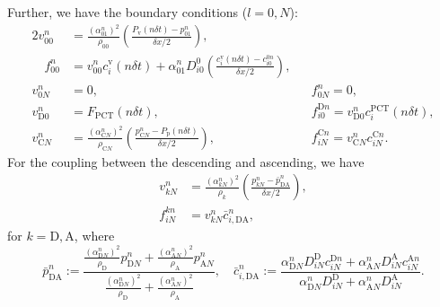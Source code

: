 \documentclass{article}
\begin{document}
Further, we have the boundary conditions ($l=0,N$):
\begin{alignat}{2}
    v_{00}^n &=\frac{(\alpha_{01}^n)^2}{\rho_{00}} \left( \frac{P_\mathrm{v}(n\delta t) - p_{01}^n}{\delta x/2} \right),\nonumber\\
    \quad f_{00}^n &= v_{00}^nc_i^\mathrm{v}(n\delta t)+\alpha_{01}^nD_{i0}^{0}\left( \frac{c_i^{\mathrm{v}}(n\delta t)-c_{i0}^{0n}}{\delta x/2} \right),\\
    v_{0N}^n &= 0,\quad &&f_{0N}^n = 0,\\
    v_{\mathrm{D}0}^n &= F_\mathrm{PCT}(n\delta t),\quad && f_{i0}^{\mathrm{D}n} = v_{\mathrm{D} 0}^nc_i^\mathrm{PCT}(n\delta t),\\
    v_{\mathrm{C}N}^n &= \frac{(\alpha_{\mathrm{C} N}^n)^2}{\rho_{\mathrm{C} N}}\left( \frac{p_{\mathrm{C}N}^n - P_\mathrm{p}(n\delta t)}{\delta x/2} \right),\quad && f_{iN}^{\mathrm{C}n} = v_{\mathrm{C} N}^nc_{iN}^{\mathrm{C}n}.
\end{alignat}
For the coupling between the descending and ascending, we have
\begin{align}
    v_{kN}^n &= \frac{(\alpha_{kN}^n)^2}{\rho_k}\left( \frac{p_{kN}^n - \bar{p}_{\mathrm{DA}}^n}{\delta x/2} \right),\\ 
    f_{iN}^{kn} &= v_{kN}^{n}\bar{c}_{i,\mathrm{DA}}^{n},
\end{align}
    for $k=\mathrm{D},\mathrm{A}$, where
\begin{equation}
    \bar{p}_{\mathrm{DA}}^n:=\frac{\frac{(\alpha_{\mathrm{D}N}^n)^2}{\rho_\mathrm{D}}p_{\mathrm{D}N}^n+\frac{(\alpha_{\mathrm{A}N}^n)^2}{\rho_\mathrm{A}}p_{\mathrm{A}N}^n}{\frac{(\alpha_{\mathrm{D}N}^n)^2}{\rho_\mathrm{D}}+\frac{(\alpha_{\mathrm{A}N}^n)^2}{\rho_\mathrm{A}}},\quad 
    \bar{c}_{i,\mathrm{DA}}^n:=\frac{{\alpha_{\mathrm{D}N}^n}D_{iN}^{\mathrm{D}}c_{iN}^{\mathrm{D}n}+{\alpha_{\mathrm{A}N}^n}D_{iN}^{\mathrm{A}}c_{iN}^{\mathrm{A}n}}{{\alpha_{\mathrm{D}N}^n}D_{iN}^{\mathrm{D}}+{\alpha_{\mathrm{A}N}^n}D_{iN}^{\mathrm{A}}}.
\end{equation}
\end{document}
